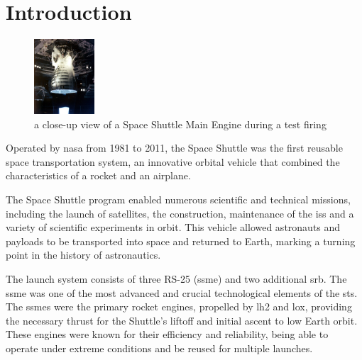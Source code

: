     \clearpage
    \section{Introduction} \label{intro}
\begin{figure} 
    \includegraphics[width=0.2\textwidth]{ssmeTestFiring.jpg}
    \caption{a close-up view of a Space Shuttle Main Engine during a test firing}
    \label{fig:ssmetestfiring}
\end{figure}

	Operated by \acrshort{nasa} from 1981 to 2011, the Space Shuttle was the first reusable space transportation system, an innovative orbital vehicle that combined the characteristics of a rocket and an airplane.
 
The Space Shuttle program enabled numerous scientific and technical missions, including the launch of satellites, the construction, maintenance of the \acrfull{iss} and a variety of scientific experiments in orbit.
This vehicle allowed astronauts and payloads to be transported into space and returned to Earth, marking a turning point in the history of astronautics.

The launch system consists of three RS-25 (\acrshort{ssme}) and two additional \acrfull{srb}. The \acrfull{ssme} was one of the most advanced and crucial technological elements of the \acrshort{sts}. The \acrshort{ssme}s were the primary rocket engines, propelled by \acrfull{lh2} and \acrfull{lox}, providing the necessary thrust for the Shuttle's liftoff and initial ascent to low Earth orbit. These engines were known for their efficiency and reliability, being able to operate under extreme conditions and be reused for multiple launches.

